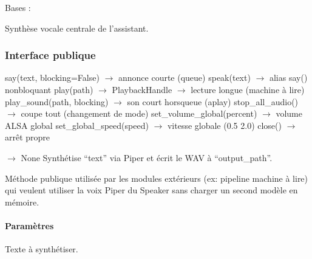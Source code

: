 \documentclass[letterpaper,10pt,french]{sphinxmanual}
\begin{document}
\begin{fulllineitems}
\label{\detokenize{api/core:core.speaker.Speaker}}
\pysigstartsignatures
\pysigline
{}
\pysigstopsignatures
\sphinxAtStartPar
Bases : 

\sphinxAtStartPar
Synthèse vocale centrale de l’assistant.


\subsubsection{Interface publique}
\label{\detokenize{api/core:interface-publique}}
\sphinxAtStartPar
say(text, blocking=False)      \(\rightarrow\) annonce courte (queue)
speak(text)                    \(\rightarrow\) alias say() non\sphinxhyphen{}bloquant
play(path) \(\rightarrow\) PlaybackHandle    \(\rightarrow\) lecture longue (machine à lire)
play\_sound(path, blocking)     \(\rightarrow\) son court hors\sphinxhyphen{}queue (aplay)
stop\_all\_audio()               \(\rightarrow\) coupe tout (changement de mode)
set\_volume\_global(percent)     \(\rightarrow\) volume ALSA global
set\_global\_speed(speed)        \(\rightarrow\) vitesse globale (0.5 \textendash{} 2.0)
close()                        \(\rightarrow\) arrêt propre

\begin{fulllineitems}
\label{\detokenize{api/core:core.speaker.Speaker.synthesize_to_file}}
\pysigstartsignatures
\pysiglinewithargsret
{}
{\sphinxparamcomma {}}
{{ $\rightarrow$ None}}
\pysigstopsignatures
\sphinxAtStartPar
Synthétise “text” via Piper et écrit le WAV à “output\_path”.

\sphinxAtStartPar
Méthode publique utilisée par les modules extérieurs (ex: pipeline
machine à lire) qui veulent utiliser la voix Piper du Speaker sans
charger un second modèle en mémoire.


\paragraph{Paramètres}
\label{\detokenize{api/core:id3}}\begin{description}
\sphinxAtStartPar
Texte à synthétiser.


\end{description}
\end{fulllineitems}
\end{fulllineitems}
\end{document}
